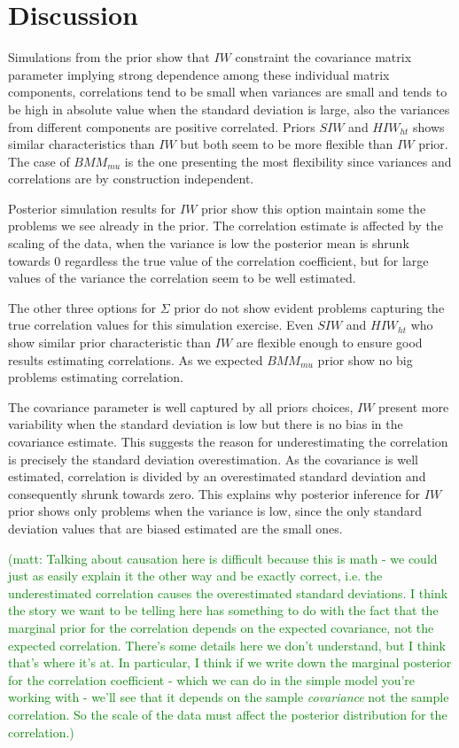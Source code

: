 \documentclass[a4paper]{article}
\newcommand{\matt}[1]{\textcolor{green}{(matt: #1)}}
\begin{document}
\section{Discussion} 

Simulations from the prior show that $IW$ constraint the covariance matrix parameter implying strong dependence among these individual matrix components, correlations tend to be small when variances are small and tends to be high in absolute value when the standard deviation is large, also the variances from different components are positive correlated.  Priors $SIW$ and $HIW_{ht}$ shows similar characteristics than $IW$ but both seem to be more flexible than $IW$ prior. The case of $BMM_{mu}$ is the one presenting the most flexibility since variances and correlations are by construction independent.

Posterior simulation results for $IW$ prior show this option maintain some the problems we see already in the prior.  The correlation estimate is affected by the scaling of the data, when the variance is low the posterior mean is shrunk towards 0 regardless the true value of the correlation coefficient, but for large values of the variance the correlation seem to be well estimated.  

The other three options for $\Sigma$ prior do not show evident problems capturing the true correlation values for this simulation exercise. Even  $SIW$ and $HIW_{ht}$ who show similar prior characteristic than $IW$ are flexible enough to ensure good results estimating correlations. As we expected $BMM_{mu}$ prior show no big problems estimating  correlation. 

The covariance parameter is well captured by all priors choices, $IW$ present more variability when the standard deviation is low but there is no bias in the covariance estimate. This suggests the reason for underestimating the correlation is precisely the standard deviation overestimation. As the covariance is well estimated, correlation is divided by an overestimated standard deviation and consequently shrunk towards zero. This explains why posterior inference for $IW$ prior shows only problems when the variance is low, since the only standard deviation values that are biased estimated are the small ones. 

\matt{Talking about causation here is difficult because this is math - we could just as easily explain it the other way and be exactly correct, i.e. the underestimated correlation causes the overestimated standard deviations. I think the story we want to be telling here has something to do with the fact that the marginal prior for the correlation depends on the expected covariance, not the expected correlation. There's some details here we don't understand, but I think that's where it's at. In particular, I think if we write down the marginal posterior for the correlation coefficient - which we can do in the simple model you're working with - we'll see that it depends on the sample {\it covariance} not the sample correlation. So the scale of the data must affect the posterior distribution for the correlation.}
\end{document}

